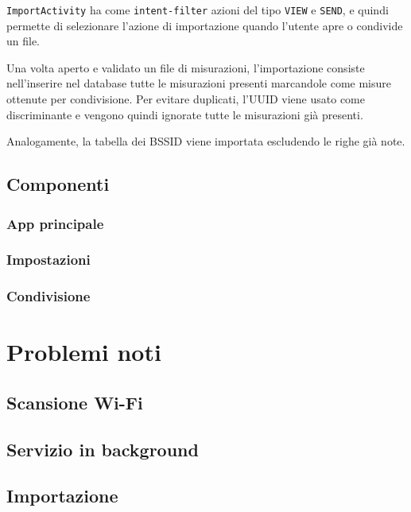 \documentclass[11pt]{article}
\begin{document}
\texttt{ImportActivity} ha come \texttt{intent-filter} azioni del tipo \texttt{VIEW} e \texttt{SEND}, e quindi permette di selezionare l'azione di importazione quando l'utente apre o condivide un file.

Una volta aperto e validato un file di misurazioni, l'importazione consiste nell'inserire nel database tutte le misurazioni presenti marcandole come misure ottenute per condivisione. Per evitare duplicati, l'UUID viene usato come discriminante e vengono quindi ignorate tutte le misurazioni già presenti.

Analogamente, la tabella dei BSSID viene importata escludendo le righe già note.


\subsection{Componenti}
\subsubsection{App principale}
\subsubsection{Impostazioni}
\subsubsection{Condivisione}



\section{Problemi noti}

\subsection{Scansione Wi-Fi}

\subsection{Servizio in background}

\subsection{Importazione}
\end{document}
